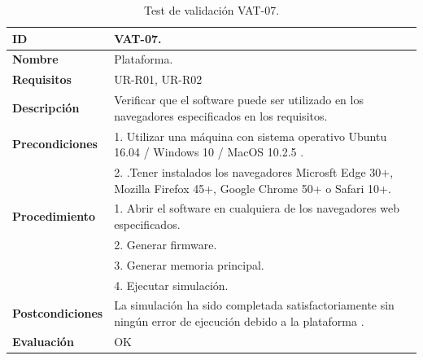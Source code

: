 \begin{center}
\begin{table}[htb]
\centering
\begin{tabular}{@{}p{2.5cm} p{9cm}@{}} 
\toprule
\textbf{ID} 					& VAT-07. \\
\midrule
\textbf{Nombre} 				& Plataforma. \\
\midrule
\textbf{Requisitos} 		& UR-R01, UR-R02\\
\midrule
\textbf{Descripción} 		& Verificar que el software puede ser utilizado en los navegadores especificados en los requisitos. \\
\midrule
\textbf{Precondiciones}		& 1. Utilizar una máquina con sistema operativo Ubuntu 16.04 / Windows 10 / MacOS 10.2.5 .\\
							& 2. .Tener instalados los navegadores Microsft Edge 30+, Mozilla Firefox 45+, Google Chrome 50+ o Safari 10+. \\
\midrule
\textbf{Procedimiento}			& 1. Abrir el software en cualquiera de los navegadores web especificados. \\
							& 2. Generar firmware.\\
							& 3. Generar memoria principal.\\
							& 4. Ejecutar simulación.\\
\midrule
\textbf{Postcondiciones} 		&  La simulación ha sido completada satisfactoriamente sin ningún error de ejecución debido a la plataforma .\\
\midrule
\textbf{Evaluación} 			& OK \\
\bottomrule
\end{tabular}
\caption{Test de validación VAT-07.}
\label{tab:vat-07}
\end{table}
\end{center}

